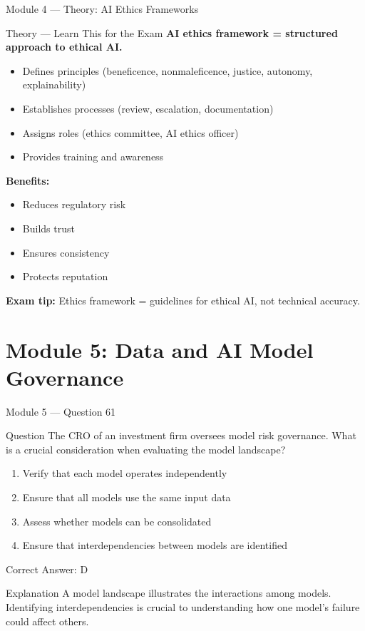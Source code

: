 \documentclass[aspectratio=169,10pt]{beamer}
\newcommand{\question}[1]{%
	\begin{block}{Question}
		#1
	\end{block}
}
\newcommand{\options}[4]{%
	\begin{enumerate}[label=\Alph*.,leftmargin=*]
		\item #1
		\item #2
		\item #3
		\item #4
	\end{enumerate}
}
\newcommand{\answerbox}[1]{%
	\begin{exampleblock}{Correct Answer: #1}
	\end{exampleblock}
}
\newcommand{\explain}[1]{%
	\begin{block}{Explanation}
		\small #1
	\end{block}
}
\newcommand{\theory}[1]{%
	\begin{block}{Theory --- Learn This for the Exam}
		\small #1
	\end{block}
}
\begin{document}
	\begin{frame}{Module 4 --- Theory: AI Ethics Frameworks}
		\theory{
			\textbf{AI ethics framework = structured approach to ethical AI.}
			\begin{itemize}
				\item Defines principles (beneficence, nonmaleficence, justice, autonomy, explainability)
				\item Establishes processes (review, escalation, documentation)
				\item Assigns roles (ethics committee, AI ethics officer)
				\item Provides training and awareness
			\end{itemize}
			\textbf{Benefits:}
			\begin{itemize}
				\item Reduces regulatory risk
				\item Builds trust
				\item Ensures consistency
				\item Protects reputation
			\end{itemize}
			\textbf{Exam tip:} Ethics framework = guidelines for ethical AI, not technical accuracy.
		}
	\end{frame}
	
	\section{Module 5: Data and AI Model Governance}
	
	\begin{frame}{Module 5 --- Question 61}
		\question{The CRO of an investment firm oversees model risk governance. What is a crucial consideration when evaluating the model landscape?}
		\options{Verify that each model operates independently}{Ensure that all models use the same input data}{Assess whether models can be consolidated}{Ensure that interdependencies between models are identified}
		\answerbox{D}
		\explain{A model landscape illustrates the interactions among models. Identifying interdependencies is crucial to understanding how one model's failure could affect others.}
	\end{frame}
	
\end{document}
